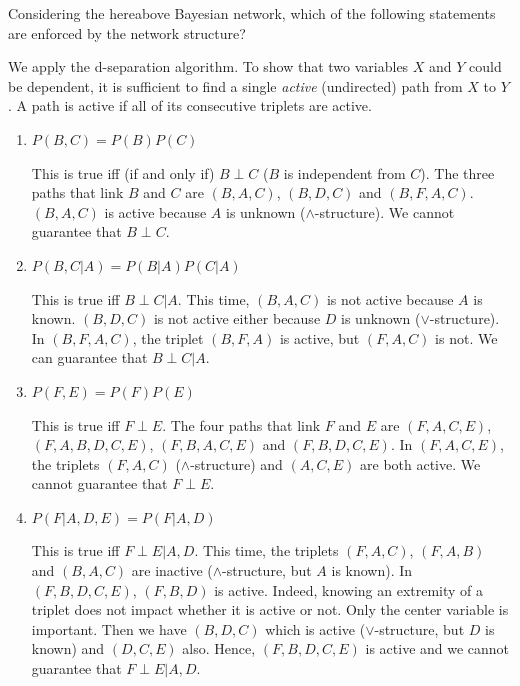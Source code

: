 \documentclass[11pt, a4paper]{article}
\begin{document}
Considering the hereabove Bayesian network, which of the following statements are enforced by the network structure?

\begin{solution}
    We apply the d-separation algorithm. To show that two variables $X$ and $Y$ could be dependent, it is sufficient to find a single \emph{active} (undirected) path from $X$ to $Y$. A path is active if all of its consecutive triplets are active.
\end{solution}

\begin{enumerate}
    \item $P(B, C) = P(B) P(C)$

    \begin{solution}
        This is true iff (if and only if) $B \perp C$ ($B$ is independent from $C$). The three paths that link $B$ and $C$ are $(B, A, C)$, $(B, D, C)$ and $(B, F, A, C)$. $(B, A, C)$ is active because $A$ is unknown ($\wedge$-structure). We cannot guarantee that $B \perp C$.
    \end{solution}

    \item $P(B, C | A) = P(B | A) P(C | A)$

    \begin{solution}
        This is true iff $B \perp C | A$. This time, $(B, A, C)$ is not active because $A$ is known. $(B, D, C)$ is not active either because $D$ is unknown ($\vee$-structure). In $(B, F, A, C)$, the triplet $(B, F, A)$ is active, but $(F, A, C)$ is not. We can guarantee that $B \perp C | A$.
    \end{solution}

    \item $P(F, E) = P(F) P(E)$

    \begin{solution}
        This is true iff $F \perp E$. The four paths that link $F$ and $E$ are $(F, A, C, E)$, $(F, A, B, D, C, E)$, $(F, B, A, C, E)$ and $(F, B, D, C, E)$. In $(F, A, C, E)$, the triplets $(F, A, C)$ ($\wedge$-structure) and $(A, C, E)$ are both active. We cannot guarantee that $F \perp E$.
    \end{solution}

    \item $P(F | A, D, E) = P(F | A, D)$

    \begin{solution}
        This is true iff $F \perp E | A, D$. This time, the triplets $(F, A, C)$, $(F, A, B)$ and $(B, A, C)$ are inactive ($\wedge$-structure, but $A$ is known). In $(F, B, D, C, E)$, $(F, B, D)$ is active. Indeed, knowing an extremity of a triplet does not impact whether it is active or not. Only the center variable is important. Then we have $(B, D, C)$ which is active ($\vee$-structure, but $D$ is known) and $(D, C, E)$ also. Hence, $(F, B, D, C, E)$ is active and we cannot guarantee that $F \perp E | A, D$.
    \end{solution}


\end{enumerate}
\end{document}
